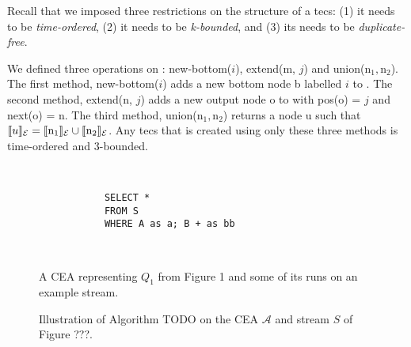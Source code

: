 Recall that we imposed three restrictions on the structure of a \acrshort{tecs}: (1) it needs to be \emph{time-ordered}, (2) it needs to be \emph{k-bounded}, and (3) its needs to be \emph{duplicate-free}.

We defined three operations on \tecs: new-bottom($i$), extend(m, $j$) and union($\text{n}_{1},\text{n}_{2}$). The first method, new-bottom($i$) adds a new bottom node b labelled $i$ to \tecs. The second method, extend(n, $j$) adds a new output node o to \tecs with pos(o) = $j$ and next(o) = n. The third method, union($\text{n}_{1},\text{n}_{2}$) returns a node u such that $\llbracket u \rrbracket_{\mathcal{E}} = \llbracket \text{n}_{1} \rrbracket_{\mathcal{E}} \cup \llbracket \text{n}_{2} \rrbracket_{\mathcal{E}}$. Any \acrshort{tecs} that is created using only these three methods is time-ordered and $3$-bounded.

\begin{figure}[H]
  \centering
  \begin{subfigure}[t]{\textwidth}
    \centering
  \end{subfigure}
  \\
  \begin{subfigure}[b]{\textwidth}
    \begin{verbatim}
      SELECT *
      FROM S
      WHERE A as a; B + as bb
    \end{verbatim}
  \end{subfigure}
  \\
  \begin{subfigure}[b]{\textwidth}
    \centering
  \end{subfigure}
  \caption{A CEA representing $Q_{1}$ from Figure 1 and some of its runs on an example stream.}
  \label{fig:label}
\end{figure}

\begin{figure}[H]
  \centering
  \begin{subfigure}[t]{0.1\linewidth}
  \end{subfigure}
  \begin{subfigure}[t]{0.1\linewidth}
  \end{subfigure}
  \begin{subfigure}[t]{0.24\linewidth}
  \end{subfigure}
  \begin{subfigure}[t]{0.24\linewidth}
  \end{subfigure}
  \begin{subfigure}[t]{0.28\linewidth}
  \end{subfigure}
  \caption{Illustration of Algorithm TODO on the CEA $\mathcal{A}$ and stream $S$ of Figure ???.}
  \label{fig:label}
\end{figure}


